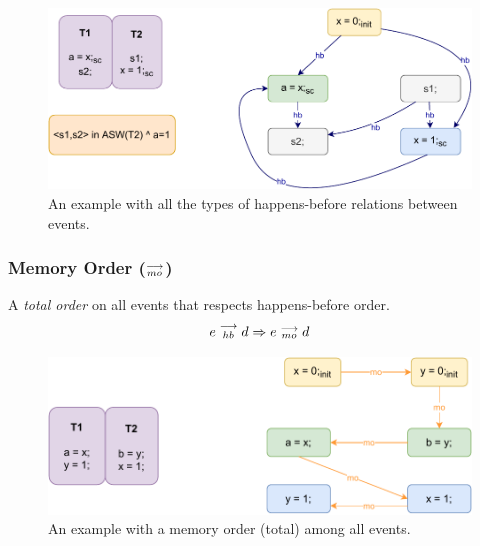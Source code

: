         \begin{figure}[H]
            \centering
            \includegraphics[scale=0.7]{ECMAScriptMemoryModel/Happens-before.pdf}
            \caption{An example with all the types of happens-before relations between events.}
        \end{figure}
    
    \subsubsection{Memory Order ($\stackrel{\longrightarrow}{_{mo}}$)}
        A \textit{total order} on all events that respects happens-before order. 
        \begin{align*}
            e\stackrel{\longrightarrow}{_{hb}}d \Rightarrow{} e\stackrel{\longrightarrow}{_{mo}}d    
        \end{align*}
        
        \begin{figure}[H]
            \centering
            \includegraphics[scale=0.7]{ECMAScriptMemoryModel/MemoryOrder.pdf}
            \caption{An example with a memory order (total) among all events.}
        \end{figure}


